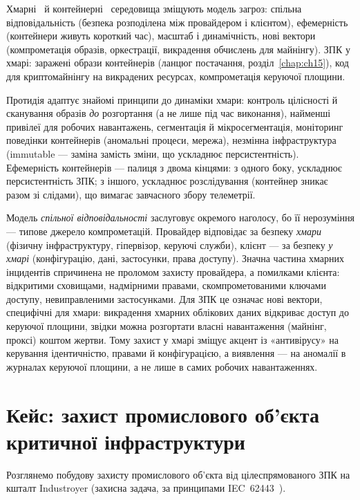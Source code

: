 Хмарні~\cite{ch14:cloud-nist} й контейнерні~\cite{ch14:container} середовища зміщують модель загроз: спільна відповідальність (безпека розподілена між провайдером і клієнтом), ефемерність (контейнери живуть короткий час), масштаб і динамічність, нові вектори (компрометація образів, оркестрації, викрадення обчислень для майнінгу). ЗПК у хмарі: заражені образи контейнерів (ланцюг постачання, розділ~\ref{chap:ch15}), код для криптомайнінгу на викрадених ресурсах, компрометація керуючої площини.

Протидія адаптує знайомі принципи до динаміки хмари: контроль цілісності й сканування образів \emph{до} розгортання (а не лише під час виконання), найменші привілеї для робочих навантажень, сегментація й мікросегментація, моніторинг поведінки контейнерів (аномальні процеси, мережа), незмінна інфраструктура (immutable --- заміна замість зміни, що ускладнює персистентність). Ефемерність контейнерів --- палиця з двома кінцями: з одного боку, ускладнює персистентність ЗПК; з іншого, ускладнює розслідування (контейнер зникає разом зі слідами), що вимагає завчасного збору телеметрії.

Модель \emph{спільної відповідальності} заслуговує окремого наголосу, бо її нерозуміння --- типове джерело компрометацій. Провайдер відповідає за безпеку \emph{хмари} (фізичну інфраструктуру, гіпервізор, керуючі служби), клієнт --- за безпеку \emph{у хмарі} (конфігурацію, дані, застосунки, права доступу). Значна частина хмарних інцидентів спричинена не проломом захисту провайдера, а помилками клієнта: відкритими сховищами, надмірними правами, скомпрометованими ключами доступу, невиправленими застосунками. Для ЗПК це означає нові вектори, специфічні для хмари: викрадення хмарних облікових даних відкриває доступ до керуючої площини, звідки можна розгортати власні навантаження (майнінг, проксі) коштом жертви. Тому захист у хмарі зміщує акцент із «антивірусу» на керування ідентичністю, правами й конфігурацією, а виявлення --- на аномалії в журналах керуючої площини, а не лише в самих робочих навантаженнях.

\section{Кейс: захист промислового об'єкта критичної інфраструктури}\label{sec:ch14-case}

Розглянемо побудову захисту промислового об'єкта від цілеспрямованого ЗПК на кшталт Industroyer (захисна задача, за принципами IEC~62443~\cite{ch14:iec62443}).

